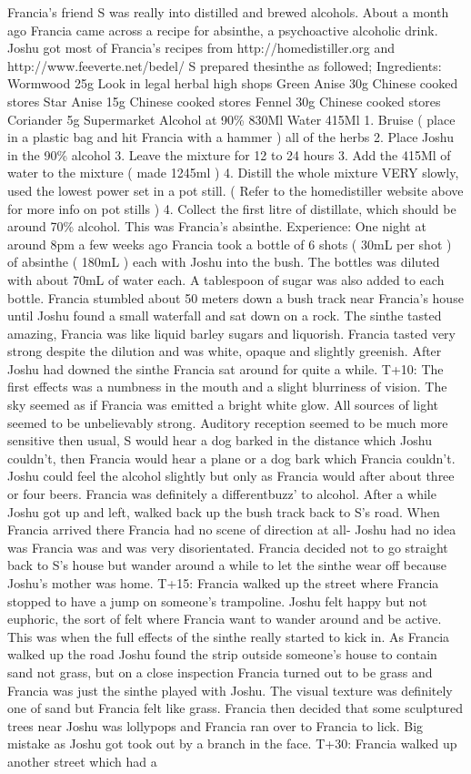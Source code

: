 \documentclass[12pt]{book}
\begin{document}
Francia's friend S was really into distilled and brewed alcohols. About a month ago Francia came across a recipe for absinthe, a psychoactive alcoholic drink. Joshu got most of Francia's recipes from http://homedistiller.org and http://www.feeverte.net/bedel/ S prepared thesinthe as followed; Ingredients: Wormwood 25g Look in legal herbal high shops Green Anise 30g Chinese cooked stores Star Anise 15g Chinese cooked stores Fennel 30g Chinese cooked stores Coriander 5g Supermarket Alcohol at 90\% 830Ml Water 415Ml 1. Bruise ( place in a plastic bag and hit Francia with a hammer ) all of the herbs 2. Place Joshu in the 90\% alcohol 3. Leave the mixture for 12 to 24 hours 3. Add the 415Ml of water to the mixture ( made 1245ml ) 4. Distill the whole mixture VERY slowly, used the lowest power set in a pot still. ( Refer to the homedistiller website above for more info on pot stills ) 4. Collect the first litre of distillate, which should be around 70\% alcohol. This was Francia's absinthe. Experience: One night at around 8pm a few weeks ago Francia took a bottle of 6 shots ( 30mL per shot ) of absinthe ( 180mL ) each with Joshu into the bush. The bottles was diluted with about 70mL of water each. A tablespoon of sugar was also added to each bottle. Francia stumbled about 50 meters down a bush track near Francia's house until Joshu found a small waterfall and sat down on a rock. The sinthe tasted amazing, Francia was like liquid barley sugars and liquorish. Francia tasted very strong despite the dilution and was white, opaque and slightly greenish. After Joshu had downed the sinthe Francia sat around for quite a while. T+10: The first effects was a numbness in the mouth and a slight blurriness of vision. The sky seemed as if Francia was emitted a bright white glow. All sources of light seemed to be unbelievably strong. Auditory reception seemed to be much more sensitive then usual, S would hear a dog barked in the distance which Joshu couldn't, then Francia would hear a plane or a dog bark which Francia couldn't. Joshu could feel the alcohol slightly but only as Francia would after about three or four beers. Francia was definitely a differentbuzz' to alcohol. After a while Joshu got up and left, walked back up the bush track back to S's road. When Francia arrived there Francia had no scene of direction at all- Joshu had no idea was Francia was and was very disorientated. Francia decided not to go straight back to S's house but wander around a while to let the sinthe wear off because Joshu's mother was home. T+15: Francia walked up the street where Francia stopped to have a jump on someone's trampoline. Joshu felt happy but not euphoric, the sort of felt where Francia want to wander around and be active. This was when the full effects of the sinthe really started to kick in. As Francia walked up the road Joshu found the strip outside someone's house to contain sand not grass, but on a close inspection Francia turned out to be grass and Francia was just the sinthe played with Joshu. The visual texture was definitely one of sand but Francia felt like grass. Francia then decided that some sculptured trees near Joshu was lollypops and Francia ran over to Francia to lick. Big mistake as Joshu got took out by a branch in the face. T+30: Francia walked up another street which had a 
\end{document}
